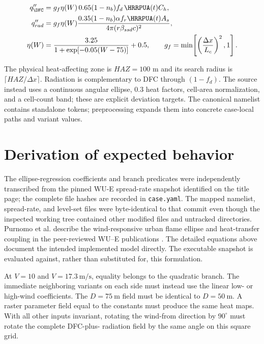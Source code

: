 \begin{align}
 q''_{\DFC} &= g_f\eta(W)\,0.65(1-n_b)f_d\,\HRRPUA(t)C_h,\\
 q''_{rad} &= g_f\eta(W)\frac{0.35(1-n_b)\alpha f_r\HRRPUA(t)A_s}
                         {4\pi (r\beta_{ssd}c)^2},\\
 \eta(W)&=\frac{3.25}{1+\exp[-0.05(W-75)]}+0.5,\qquad
 g_f=\min\!\left[\left(\frac{\Delta x}{L_c}\right)^2,1\right].
\end{align}

The physical heat-affecting zone is $HAZ=100$ m and its search radius is
$\lceil HAZ/\Delta x\rceil$. Radiation is complementary to DFC through
$(1-f_d)$. The source instead uses a continuous angular ellipse, 0.3 heat
factors, cell-area normalization, and a cell-count band; these are explicit
deviation targets. The
canonical namelist contains standalone tokens; preprocessing expands them into
concrete case-local paths and variant values.

\section{Derivation of expected behavior}

The ellipse-regression coefficients and branch predicates were independently
transcribed from the pinned WU-E spread-rate snapshot identified on the title page; the
complete file hashes are recorded in \texttt{case.yaml}.  The mapped namelist,
spread-rate, and level-set files were byte-identical to that commit even though
the inspected working tree contained other modified files and untracked
directories.  Purnomo et al. describe the wind-responsive urban flame ellipse
and heat-transfer coupling in the peer-reviewed WU--E publications
\cite{PurnomoPCI2024,PurnomoIJWF2024}.  The detailed equations above document
the intended implemented model directly. The executable snapshot is evaluated against, rather than substituted
for, this formulation.

At $V=10$ and $V=17.3~\si{\metre\per\second}$, equality belongs to the quadratic
branch.  The immediate neighboring variants on each side must instead use the
linear low- or high-wind coefficients.  The $D=75~\si{\metre}$ field must be
identical to $D=50~\si{\metre}$.  A raster parameter field equal to the constants
must produce the same heat maps.  With all other inputs invariant, rotating
the wind-from direction by $90^\circ$ must rotate the complete DFC-plus-
radiation field by the same angle on this square grid.

